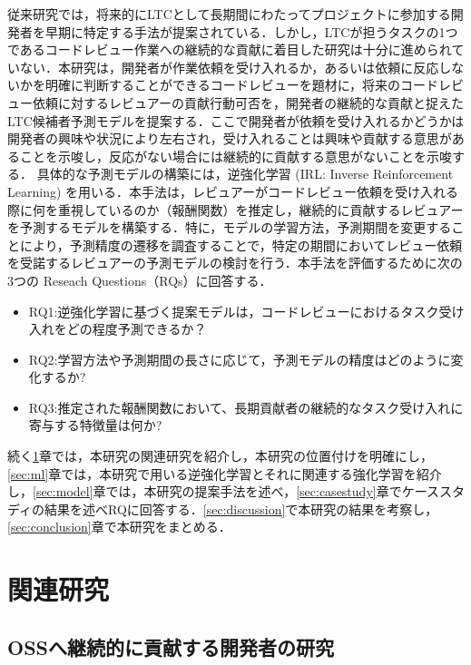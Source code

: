 \documentclass[submit,techrep,noauthor]{ipsj}
\begin{document}
従来研究では，将来的にLTCとして長期間にわたってプロジェクトに参加する開発者を早期に特定する手法が提案されている\cite{related1}\cite{LTC}．しかし，LTCが担うタスクの1つであるコードレビュー作業への継続的な貢献に着目した研究は十分に進められていない．本研究は，開発者が作業依頼を受け入れるか，あるいは依頼に反応しないかを明確に判断することができるコードレビューを題材に，将来のコードレビュー依頼に対するレビュアーの貢献行動可否を，開発者の継続的な貢献と捉えたLTC候補者予測モデルを提案する．ここで開発者が依頼を受け入れるかどうかは開発者の興味や状況により左右され，受け入れることは興味や貢献する意思があることを示唆し，反応がない場合には継続的に貢献する意思がないことを示唆する．
具体的な予測モデルの構築には，逆強化学習 (IRL: Inverse Reinforcement Learning) を用いる．本手法は，レビュアーがコードレビュー依頼を受け入れる際に何を重視しているのか（報酬関数）を推定し，継続的に貢献するレビュアーを予測するモデルを構築する．特に，モデルの学習方法，予測期間を変更することにより，予測精度の遷移を調査することで，特定の期間においてレビュー依頼を受諾するレビュアーの予測モデルの検討を行う．本手法を評価するために次の3つの Reseach Questions（RQs）に回答する．
\begin{itemize}
    \item RQ1:逆強化学習に基づく提案モデルは，コードレビューにおけるタスク受け入れをどの程度予測できるか？
    \item RQ2:学習方法や予測期間の長さに応じて，予測モデルの精度はどのように変化するか?
    \item RQ3:推定された報酬関数において、長期貢献者の継続的なタスク受け入れに寄与する特徴量は何か?
\end{itemize}


続く\ref{sec:related}章では，本研究の関連研究を紹介し，本研究の位置付けを明確にし，\ref{sec:ml}章では，本研究で用いる逆強化学習とそれに関連する強化学習を紹介し，\ref{sec:model}章では，本研究の提案手法を述べ，\ref{sec:casestudy}章でケーススタディの結果を述べRQに回答する．\ref{sec:discussion}で本研究の結果を考察し，\ref{sec:conclusion}章で本研究をまとめる．




\section{関連研究}\label{sec:related}

\subsection{OSSへ継続的に貢献する開発者の研究}
\end{document}
